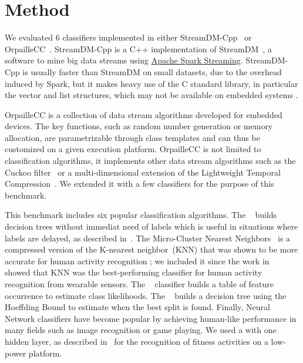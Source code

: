 \section{Method}
We evaluated 6 classifiers implemented in either
StreamDM-Cpp~\cite{StreamDM-CPP} or
OrpailleCC~\cite{OrpailleCC}.  StreamDM-Cpp is a
C++ implementation of StreamDM~\cite{StreamDM}, a
software to mine big data streams using
\href{https://spark.apache.org/streaming/}{Apache
Spark Streaming}. StreamDM-Cpp is usually faster
than StreamDM on small datasets, due to the
overhead induced by Spark, but it makes heavy use
of the C standard library, in particular the
vector and list structures, which may not be
available on embedded systems .

OrpailleCC is a collection of data stream
algorithms developed for embedded devices. The key
functions, such as random number generation or
memory allocation, are parametrizable through
class templates and can thus be customized on a
given execution platform.  OrpailleCC is not
limited to classification algorithms, it
implements other data stream algorithms such as
the Cuckoo filter~\cite{cuckoo} or a
multi-dimensional extension of the Lightweight
Temporal Compression~\cite{multi-ltc}. We extended
it with a few classifiers for the purpose of this
benchmark.

This benchmark includes six popular classification
algorithms.  The
\mondrianforest~\cite{mondrian2014} builds
decision trees without immediat need of labels
which is useful in situations where labels are
delayed, as described
in~\cite{stream_learning_review}.  The
Micro-Cluster Nearest
Neighbors~\cite{mc-nn} is a compressed version of the K-nearest
neighbor~(KNN) that was shown to be more accurate for human activity
recognition ; we included
it since the work in~\cite{Janidarmian_2017} showed that KNN was the
best-performing classifier for human activity recognition from wearable
sensors.  The \naivebayes~\cite{naive_bayes}
classifier builds a table of feature
occurrence to estimate class
likelihoods.
The \hoeffdingtree~\cite{VFDT} builds a
decision tree using the Hoeffding Bound to
estimate when the best split is found. 
Finally, Neural Network classifiers have
become popular by achieving human-like performance in many fields such as image
recognition or game playing. We used a
\FNN with one hidden layer, as described in~\cite{omid_2019} for the recognition 
of fitness activities on a low-power platform.



